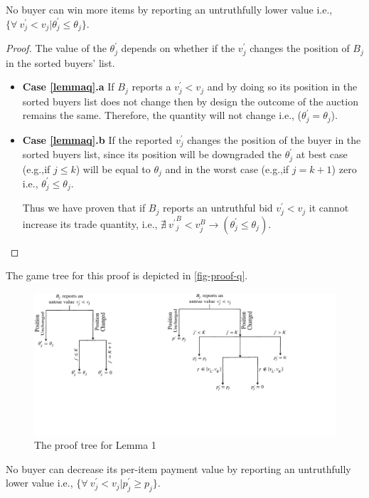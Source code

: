 \begin{Lemma}
\label{lemmaq}
No buyer can win more items by reporting an untruthfully lower value i.e., $\{\forall \ v^\prime_j < v_j | \theta^\prime_{j} \leq \theta_{j} \}$.
\end{Lemma}
\begin{proof}
The value of the $\theta^\prime_j$ depends on whether if the $v^\prime_j$ changes the position of $B_j$ in the sorted buyers' list.
\begin{itemize}
    \item[] \textbf{Case \ref{lemmaq}.a} If $B_j$ reports a $v^\prime_j < v_j$ and by doing so its position in the sorted buyers list does not change then by design the outcome of the auction remains the same. Therefore, the quantity will not change i.e., (${\theta_{j}^\prime} = \theta_{j}$).
    \item[] \textbf{Case \ref{lemmaq}.b} If the reported $v^\prime_j$ changes the position of the buyer in the sorted buyers list, since its position will be downgraded the $\theta^\prime_{j}$ at best case (e.g.,if $j \leq k$) will be equal to $\theta_{j}$ and in the worst case (e.g.,if $j=k+1$) zero i.e., ${\theta_{j}^\prime} \leq \theta_{j}$.


Thus we have proven that if $B_j$ reports an untruthful bid $v^\prime_j < v_j$ it cannot increase its trade quantity, i.e., $\nexists \ {{v^\prime}^B_{j} < v^B_{j}}\rightarrow ({\theta_{j}^\prime} \leq \theta_{j})$.
\end{itemize}
\end{proof}
\vspace{-5mm}
The game tree for this proof is depicted in \autoref{fig-proof-q}.
\begin{figure}[htbp]
\centering
\includegraphics{Figures/proofq}
\caption{The proof tree for Lemma 1}
\label{fig-proof-q}
\vspace{-2mm}
\end{figure}
\begin{Lemma}
\label{lemma-p}
No buyer can decrease its per-item payment value by reporting an untruthfully lower value i.e., $\{\forall \ v^\prime_j < v_j | p^\prime_{j} \geq p_{j} \}$.
\end{Lemma}
